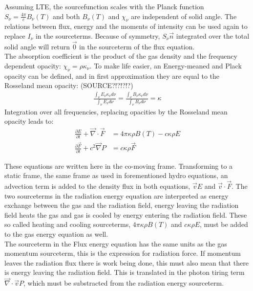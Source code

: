 Assuming LTE, the sourcefunction scales with the Planck function $S_\nu = \frac{4\pi}{c} B_\nu(T)$ and both $B_\nu(T)$ and $\chi_\nu$ are independent of solid angle. The relations between flux, energy and the moments of intensity can be used again to replace $I_\nu$ in the sourceterms. Because of symmetry, $S_\nu \vec{n}$ integrated over the total solid angle will return $\vec{0}$ in the sourceterm of the flux equation.\\
The absorption coefficient is the product of the gas density and the frequency dependent opacity: $\chi_\nu = \rho \kappa_\nu$. To make life easier, an Energy-meaned and Plack opacity can be defined, and in first approximation they are equal to the Rosseland mean opacity: (SOURCE?!?!?!?)
\begin{align}
\frac{\int_\nu E_\nu \kappa_\nu d\nu}{\int_\nu E_\nu d\nu} = \frac{\int_\nu B_\nu \kappa_\nu d\nu}{\int_\nu B_\nu d\nu} = \kappa
\end{align}
Integration over all frequencies, replacing opacities by the Rosseland mean opacity leads to:
\begin{align}
\frac{\partial E}{\partial t} + \vec{\nabla} \cdot \vec{F} &= 4\pi \kappa\rho B(T) - c \kappa \rho E\\
\frac{\partial \vec{F}}{\partial t} + c^2 \vec{\nabla} P &=  c \kappa \rho \vec{F} 
\end{align}

These equations are written here in the co-moving frame. Transforming to a static frame, the same frame as used in forementioned hydro equations, an advection term is added to the density flux in  both equations, $\vec{v} E$ and $\vec{v} \cdot \vec{F}$. The two sourceterms in the radiation energy equation are interpreted as energy exchange between the gas and the radiation field, energy leaving the radiation field heats the gas and gas is cooled by energy entering the radiation field. These so called heating and cooling sourceterms, $4\pi \kappa\rho B(T)$ and $ c \kappa \rho E$, must be added to the gas energy equation as well. \\
The sourceterm in the Flux energy equation has the same units as the gas momentum sourceterm, this is the expression for radiation force. If momentum leaves the radiation flux there is work being done, this must also mean that there is energy leaving the radiation field. This is translated in the photon tiring term $\vec{\nabla} \cdot \vec{v} P$, which must be substracted from the radiation energy sourceterm.

